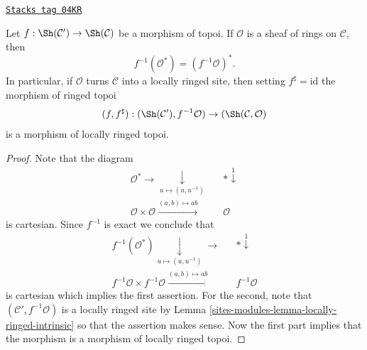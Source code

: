 \begin{lemma}
\label{sites-modules-lemma-locally-ringed-intrinsic-morphism}
\href{https://stacks.math.columbia.edu/tag/04KR}{\texttt{Stacks tag 04KR}}

Let $f : \Sh(\mathcal{C}') \to \Sh(\mathcal{C})$
be a morphism of topoi. If $\mathcal{O}$ is a sheaf of rings
on $\mathcal{C}$, then
$$
f^{-1}(\mathcal{O}^*) = (f^{-1}\mathcal{O})^*.
$$
In particular, if $\mathcal{O}$ turns $\mathcal{C}$ into a locally
ringed site, then setting $f^\sharp = \text{id}$
the morphism of ringed topoi
$$
(f, f^\sharp) :
(\Sh(\mathcal{C}'), f^{-1}\mathcal{O})
\to
(\Sh(\mathcal{C}, \mathcal{O})
$$
is a morphism of locally ringed topoi.
\end{lemma}

\begin{proof}
Note that the diagram
$$
\begin{array}{ccc}\mathcal{O}^* \longrightarrow\underset{u \mapsto (u, u^{-1})}{\downarrow} &  & {*} \overset{1}{\downarrow} \\ \mathcal{O} \times \mathcal{O} \overset{(a, b) \mapsto ab}{\longrightarrow} &  & \mathcal{O}\end{array}
$$
is cartesian. Since $f^{-1}$ is exact we conclude that
$$
\begin{array}{ccc}f^{-1}(\mathcal{O}^*)
\underset{u \mapsto (u, u^{-1})}{\downarrow}\longrightarrow &  & {*} \overset{1}{\downarrow} \\ f^{-1}\mathcal{O} \times f^{-1}\mathcal{O} \overset{(a, b) \mapsto ab}{\longrightarrow} &  & f^{-1}\mathcal{O}\end{array}
$$
is cartesian which implies the first assertion. For the second,
note that $(\mathcal{C}', f^{-1}\mathcal{O})$ is a locally ringed site
by
Lemma \ref{sites-modules-lemma-locally-ringed-intrinsic}
so that the assertion makes sense. Now the first part implies that
the morphism is a morphism of locally ringed topoi.
\end{proof}

